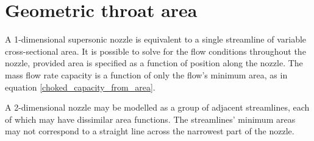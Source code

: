\documentclass[11pt, twoside]{report}
\begin{document}




\chapter{Geometric throat area}






A 1-dimensional supersonic nozzle is equivalent to a single streamline of variable cross-sectional area. It is possible to solve for the flow conditions throughout the nozzle, provided area is specified as a function of position along the nozzle. The mass flow rate capacity is a function of only the flow's minimum area, as in equation \ref{choked_capacity_from_area}.

A 2-dimensional nozzle may be modelled as a group of adjacent streamlines, each of which may have dissimilar area functions. The streamlines' minimum areas may not correspond to a straight line across the narrowest part of the nozzle. 
\end{document}
